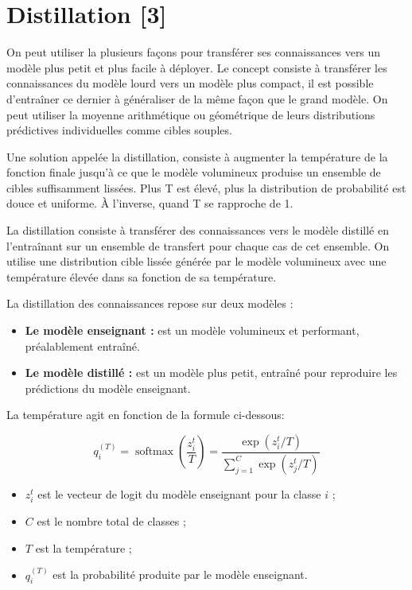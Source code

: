 \documentclass[12pt,a4paper]{report}
\begin{document}
\chapter{Distillation [3]}

On peut utiliser la plusieurs façons pour transférer ses connaissances vers un modèle plus petit et plus facile 
à déployer. Le concept consiste à transférer les connaissances du modèle lourd vers un modèle plus compact, il est possible 
d'entraîner ce dernier à généraliser de la même façon que le grand modèle. On peut utiliser la moyenne 
arithmétique ou géométrique de leurs distributions prédictives individuelles comme cibles souples.

Une solution appelée la distillation, consiste à augmenter la température de la fonction 
finale jusqu'à ce que le modèle volumineux produise un ensemble de cibles suffisamment lissées.
Plus T est élevé, plus la distribution de probabilité est douce et uniforme. À l'inverse, quand T se rapproche de 1.

La distillation consiste à transférer des connaissances vers le modèle distillé en l'entraînant sur un 
ensemble de transfert pour chaque cas de cet ensemble. On utilise une distribution cible lissée 
générée par le modèle volumineux avec une température élevée dans sa fonction de sa température.

La distillation des connaissances repose sur deux modèles :
\begin{itemize}
    \item \textbf{Le modèle enseignant : } est un modèle volumineux et performant, préalablement entraîné.
    \item \textbf{Le modèle distillé : } est un modèle plus petit, entraîné pour reproduire les prédictions du modèle enseignant.
\end{itemize}

La température agit en fonction de la formule ci-dessous:

\begin{equation}
q_i^{(T)}
=
\operatorname{softmax}\left(\frac{z_i^{t}}{T}\right)
=
\frac{\exp\left(z_i^{t}/T\right)}
{\displaystyle\sum_{j=1}^{C}
\exp\left(z_j^{t}/T\right)}
\end{equation}

\begin{itemize}
    \item $z_i^{t}$ est le vecteur de logit du modèle enseignant pour la classe $i$ ;
    \item $C$ est le nombre total de classes ;
    \item $T$ est la température ;
    \item $q_i^{(T)}$ est la probabilité produite par le modèle enseignant.
\end{itemize}
\end{document}
